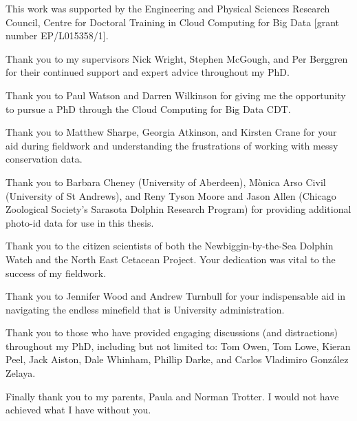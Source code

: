 
\begin{acknowledgements}

This work was supported by the Engineering and Physical Sciences Research Council, Centre for Doctoral Training in Cloud Computing for Big Data [grant number EP/L015358/1]. \newline

\noindent Thank you to my supervisors Nick Wright, Stephen McGough, and Per Berggren for their continued support and expert advice throughout my PhD. \newline

\noindent Thank you to Paul Watson and Darren Wilkinson for giving me the opportunity to pursue a PhD through the Cloud Computing for Big Data CDT. \newline

\noindent Thank you to Matthew Sharpe, Georgia Atkinson, and Kirsten Crane for your aid during fieldwork and understanding the frustrations of working with messy conservation data.\newline

\noindent Thank you to Barbara Cheney (University of Aberdeen), M\`{o}nica Arso Civil (University of St Andrews), and Reny Tyson Moore and Jason Allen (Chicago Zoological Society's Sarasota Dolphin Research Program) for providing additional photo-id data for use in this thesis.\newline

\noindent Thank you to the citizen scientists of both the Newbiggin-by-the-Sea Dolphin Watch and the North East Cetacean Project. Your dedication was vital to the success of my fieldwork. \newline

\noindent Thank you to Jennifer Wood and Andrew Turnbull for your indispensable aid in navigating the endless minefield that is University administration.\newline

\noindent Thank you to those who have provided engaging discussions (and distractions) throughout my PhD, including but not limited to: Tom Owen, Tom Lowe, Kieran Peel, Jack Aiston, Dale Whinham, Phillip Darke, and Carlos Vladimiro González Zelaya. \newline

\noindent Finally thank you to my parents, Paula and Norman Trotter. I would not have achieved what I have without you.

\end{acknowledgements}
